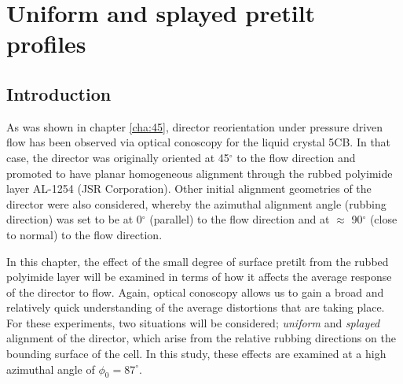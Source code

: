 \chapter{Uniform and splayed pretilt profiles}
\label{cha:splay_uniform}
\section{Introduction}
As was shown in chapter \ref{cha:45}, director reorientation under pressure driven flow has been observed via optical conoscopy for the liquid crystal 5CB. In that case, the director was originally oriented at 45$^{\circ}$ to the flow direction and promoted to have planar homogeneous alignment through the rubbed polyimide layer AL-1254 (JSR Corporation). Other initial alignment geometries of the director were also considered, whereby the azimuthal alignment angle (rubbing direction) was set to be at 0$^{\circ}$ (parallel) to the flow direction and at $\approx$ 90$^{\circ}$ (close to normal) to the flow direction.

In this chapter, the effect of the small degree of surface pretilt from the rubbed polyimide layer will be examined in terms of how it affects the average response of the director to flow. Again, optical conoscopy allows us to gain a broad and relatively quick understanding of the average distortions that are taking place. For these experiments, two situations will be considered; \textit{uniform} and \textit{splayed} alignment of the director, which arise from the relative rubbing directions on the bounding surface of the cell. In this study, these effects are examined at a high azimuthal angle of $\phi_0=87^{\circ}$.

